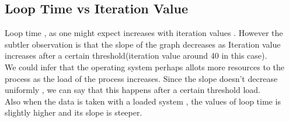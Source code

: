 \documentclass[a4paper,11pt]{report}
\begin{document}
\subsection{Loop Time vs Iteration Value} 
Loop time , as one might expect increases with iteration values . However the subtler observation is that the slope of the graph decreases as Iteration value increases after a certain threshold(iteration value around 40 in this case).\\
We could infer that the operating system perhaps allots more resources to the process as the load of the process increases. Since the slope doesn't decrease uniformly , we can say that this happens after a certain threshold load. \\
Also when the data is taken with a loaded system , the values of loop time is slightly higher and its slope is steeper.\\
\end{document}
